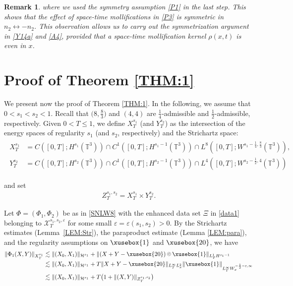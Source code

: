 \documentclass[%
11pt,  reqno]{amsart}
\def\<#1>{\xusebox{#1}}
\newcommand{\pl}{\mathbin{\scaleobj{0.7}{\tikz \draw (0,0) node[shape=circle,draw,inner sep=0pt,minimum size=8.5pt] {\scriptsize $<$};}}}
\newtheorem{remark}[theorem]{Remark}
\newcommand{\1}{\hspace{0.2mm}\text{I}\hspace{0.2mm}}
\newcommand{\noi}{\noindent}
\newcommand{\T}{\mathbb{T}}
\newcommand{\eps}{\varepsilon}
\newcommand{\les}{\lesssim}
\renewcommand{\H}{\mathcal{H}}
\numberwithin{equation}{section}
\numberwithin{theorem}{section}
\begin{document}
\begin{remark}
\noi
where we used the symmetry assumption \eqref{P1}
in the last step.
This shows that 
 the effect of space-time mollifications in \eqref{P3} 
is symmetric in  $n_2 \leftrightarrow -n_2$.
This observation allows us to carry out the symmetrization argument
in \eqref{Y14a} and \eqref{A4}, provided  that 
 a space-time mollification kernel $\rho(x, t)$ is even in $x$.



%
%
\end{remark}




\section{Proof of Theorem \ref{THM:1}}
\label{SEC:proof1}

We present now the proof of Theorem \ref{THM:1}.
In the following, we assume that $0 < s_1< s_2 < 1$.
Recall that 
$\big(8, \frac{8}{3}\big)$ 
and $(4, 4)$ are $\frac 14$-admissible
and  $\frac 12$-admissible, respectively.
Given $0 < T \leq 1$, 
we define $X^{s_1}_T$
(and $Y^{s_2}_T$) as the intersection of the energy spaces of regularity  $s_1$ 
(and $s_2$, respectively) and the Strichartz space:
\begin{align}
\begin{split}
 X^{s_1}_T 
 & = C([0,T];H^{s_1}(\T^3))\cap C^1([0,T]; H^{s_1-1}(\T^3))
 \cap L^8([0, T]; W^{s_1-\frac 14, \frac{8}{3}}(\T^3)),\\
 Y^{s_2}_T 
 & = C([0,T];H^{s_2}(\T^3))\cap C^1([0,T]; H^{s_2-1}(\T^3))
 \cap L^4([0, T]; W^{s_2 - \frac 12, 4}(\T^3))
\end{split}
 \label{M0}
\end{align}

\noi
and set 
\begin{align*}
Z^{s_1, s_2}_T =  X^{s_1}_T\times  Y^{s_2}_T.
\end{align*}





Let $\Phi = (\Phi_1, \Phi_2)$ be as in \eqref{SNLW8}
with the enhanced data set $\Xi$ in \eqref{data1}
belonging to $\mathcal{X}^{s_1, s_2, \eps}_T$
for some small $\eps = \eps(s_1, s_2)> 0$.
By the Strichartz estimates (Lemma~\ref{LEM:Str}), 
 the paraproduct estimate (Lemma \ref{LEM:para}), 
 and the regularity assumptions on $\<1>$ and $\<20>$, we have 
\begin{align}
\| \Phi_1(X, Y) \|_{X^{s_1}_T}
& \les \| (X_0, X_1) \|_{\H^{s_1}}
+  \|(X+Y-\<20>)\pl \<1>\|_{L^1_T H^{s_1 - 1}}\notag\\
& \les \| (X_0, X_1) \|_{\H^{s_1}}
+  T \|X+Y-\<20>\|_{L^\infty_{T}L^2_x} \| \<1>\|_{L^\infty_T W_x^{-\frac 12 -\eps, \infty}}\notag \\
& \les \| (X_0, X_1) \|_{\H^{s_1}}
+  T \big( 1 + \|(X, Y)\|_{Z^{s_1, s_2}_T} \big)
\label{M1}
\end{align}
\end{document}
